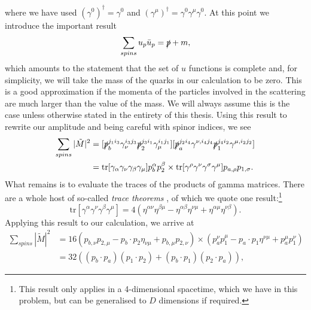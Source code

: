 where we have used $(\gamma^0)^\dagger = \gamma^0$ and $(\gamma^\mu)^\dagger = \gamma^0 \gamma^\mu \gamma^0$. At this point we introduce the important result
\begin{equation}
\sum_{spins} u_p \bar{u}_p = \slashed{p} + m, 
\end{equation}
which amounts to the statement that the set of $u$ functions is complete and, for simplicity, we will take the mass of the quarks in our calculation to be zero. This is a good approximation if the momenta of the particles involved in the scattering are much larger than the value of the mass. We will always assume this is the case unless otherwise stated in the entirety of this thesis. Using this result to rewrite our amplitude and being careful with spinor indices, we see
\begin{equation}
\begin{split}
\sum_{spins}|\tilde{M}|^2  & =  [\slashed{p}_b^{j_1 i_3} \gamma_\nu^{i_3 j_3} \slashed{p}_2^{j_3 i_1} \gamma_\mu^{i_1 j_1}][\slashed{p}_a^{j_2 i_4} \gamma^{\nu,i_4 j_4} \slashed{p}_1^{j_4 i_2} \gamma^{\mu,i_2 j_2}] \\
&= \text{tr}[\gamma_\alpha \gamma_\nu \gamma_\beta \gamma_\mu]p_b^\alpha p_2^\beta \times \text{tr}[\gamma^\rho \gamma^\nu \gamma^\sigma \gamma^\mu] p_{a, \rho} p_{1, \sigma}.
\end{split}
\end{equation}
What remains is to evaluate the traces of the products of gamma matrices. There are a whole host of so-called \emph{trace theorems} \cite{Peskin1995}, of which we quote one result:\footnote{This result only applies in a 4-dimensional spacetime, which we have in this problem, but can be generalised to $D$ dimensions if required.}
\begin{equation}
\text{tr}[\gamma^\alpha \gamma^\nu \gamma^\beta \gamma^\mu] = 4(\eta^{\alpha \nu} \eta^{\beta \mu} - \eta^{\alpha \beta} \eta^{\nu \mu} + \eta^{\alpha \mu} \eta^{\nu \beta}).
\end{equation}
Applying this result to our calculation, we arrive at
\begin{equation}
\begin{split}
\sum_{spins}|\tilde{M}|^2 &= 16 (p_{b, \nu} p_{2, \mu} - p_b \cdot p_2 \eta_{\nu \mu} + p_{b, \mu} p_{2, \nu}) \times (p_a^\nu p_1^\mu - p_a \cdot p_1 \eta^{\nu \mu} + p_a^\mu p_1^\nu) \\
&= 32 \left((p_b \cdot p_a)(p_1 \cdot p_2) + (p_b \cdot p_1)(p_2 \cdot p_a) \right),
\end{split}
\end{equation}
